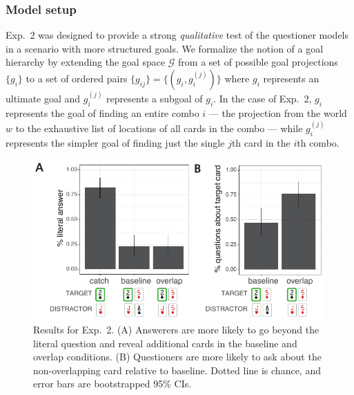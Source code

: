 \documentclass[11pt, floatsintext]{apa6}
\begin{document}
\subsubsection{Model setup}

Exp.~2 was designed to provide a strong \emph{qualitative} test of the questioner models in a scenario with more structured goals.
We formalize the notion of a goal hierarchy by extending the goal space $\mathcal{G}$ from a set of possible goal projections $\{g_i\}$ to a set of ordered pairs $\{g_{ij}\} = \{(g_i, g_i^{(j)})\}$ where $g_i$ represents an ultimate goal and $g_i^{(j)}$ represents a subgoal of $g_i$. 
In the case of Exp.~2, $g_i$ represents the goal of finding an entire combo $i$ --- the projection from the world $w$ to the exhaustive list of locations of all cards in the combo --- while $g_i^{(j)}$ represents the simpler goal of finding just the single $j$th card in the $i$th combo. 


\begin{figure}[th!]
\begin{center}
\includegraphics[scale = 1]{Exp2/qualitativeResults.pdf}
\end{center}
\caption{Results for Exp.~2. (A) Answerers are more likely to go beyond the literal question and reveal additional cards in the baseline and overlap conditions. (B) Questioners are more likely to ask about the non-overlapping card relative to baseline. Dotted line is chance, and error bars are bootstrapped 95\% CIs.}
\label{fig:exp2results}
\end{figure}
\end{document}
